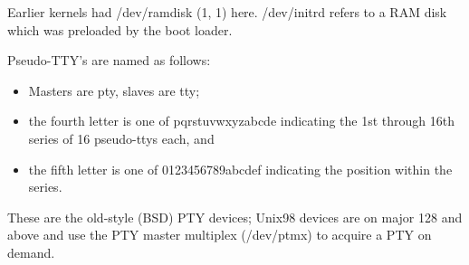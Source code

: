 \noindent
Earlier kernels had {\file /dev/ramdisk} (1, 1) here.  {\file /dev/initrd}
refers to a RAM disk which was preloaded by the boot loader.

\begin{devicelist}
	\minordots
\end{devicelist}

\noindent
Pseudo-TTY's are named as follows:
\begin{itemize}
\item Masters are {\file pty}, slaves are {\file tty};
\item the fourth letter is one of {\file pqrstuvwxyzabcde} indicating
the 1st through 16th series of 16 pseudo-ttys each, and
\item the fifth letter is one of {\file 0123456789abcdef} indicating
the position within the series.
\end{itemize}

\noindent
These are the old-style (BSD) PTY devices; Unix98 devices are on major
128 and above and use the PTY master multiplex ({\file /dev/ptmx}) to
acquire a PTY on demand.

